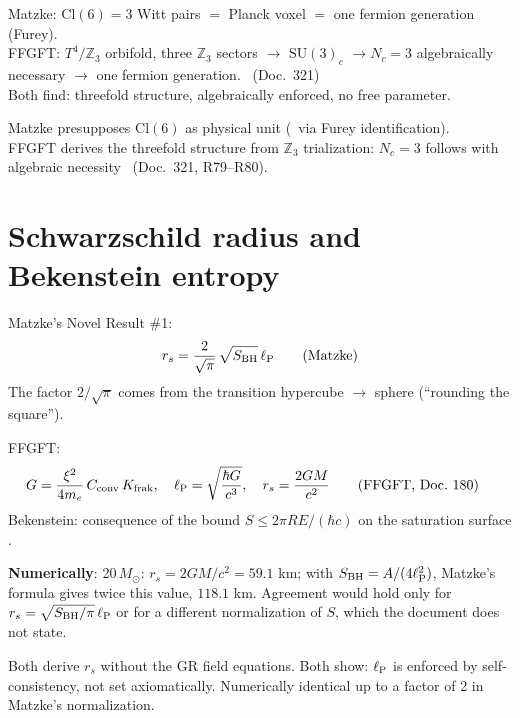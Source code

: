\begin{tcolorbox}[convbox, title={Convergence: fermion generation = algebraic base unit}]
  Matzke: $\mathrm{Cl}(6) = 3$ Witt pairs $=$ Planck voxel $=$ one fermion
  generation (Furey). \B\\
  FFGFT: $T^4/\mathbb{Z}_3$ orbifold, three $\mathbb{Z}_3$ sectors $\to$
  $\mathrm{SU}(3)_c$ $\to N_c = 3$ algebraically necessary $\to$ one
  fermion generation. \B\ (Doc.\ 321)\\
  Both find: threefold structure, algebraically enforced, no free parameter.
\end{tcolorbox}

\begin{tcolorbox}[divbox, title={Divergence: depth of derivation}]
  Matzke presupposes $\mathrm{Cl}(6)$ as physical unit (\SETZ\ via Furey
  identification).\\
  FFGFT derives the threefold structure from $\mathbb{Z}_3$ trialization:
  $N_c = 3$ follows with algebraic necessity \B\ (Doc.\ 321, R79--R80).
\end{tcolorbox}

\section{Schwarzschild radius and Bekenstein entropy}

Matzke's Novel Result \#1:
\begin{equation}
  r_s = \frac{2}{\sqrt{\pi}}\,\sqrt{S_{\mathrm{BH}}}\,\ell_{\mathrm{P}}
  \tag{Matzke}
\end{equation}
The factor $2/\sqrt{\pi}$ comes from the transition hypercube $\to$
sphere (\enquote{rounding the square}).

FFGFT:
\begin{align}
  G &= \frac{\xi^2}{4m_e}\,C_{\text{conv}}\,K_{\text{frak}},\quad \ell_{\mathrm{P}} = \sqrt{\frac{\hbar G}{c^3}},\quad
  r_s = \frac{2GM}{c^2}
  \tag{FFGFT, Doc.\ 180}
\end{align}
Bekenstein: consequence of the bound $S \leq 2\pi RE/(\hbar c)$ on the
saturation surface \B.

\textbf{Numerically}: 20\,$M_\odot$: $r_s = 2GM/c^2 = 59.1$ km; with $S_{\mathrm{BH}} = A/(4\ell_{\mathrm{P}}^2)$, Matzke's formula gives twice this value, $118.1$ km. Agreement would hold only for $r_s = \sqrt{S_{\mathrm{BH}}/\pi}\,\ell_{\mathrm{P}}$ or for a different normalization of $S$, which the document does not state.

\begin{tcolorbox}[convbox, title={Convergence}]
  Both derive $r_s$ without the GR field equations.
  Both show: $\ell_{\mathrm{P}}$ is enforced by self-consistency, not set axiomatically.
  Numerically identical up to a factor of 2 in Matzke's normalization.
\end{tcolorbox}

